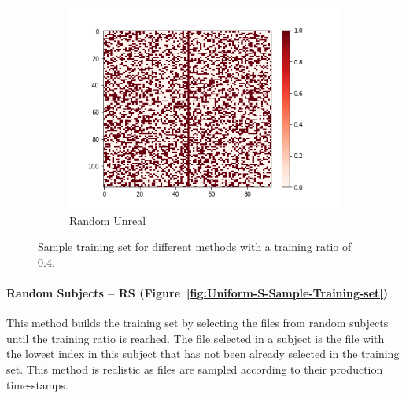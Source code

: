 \documentclass[10pt, conference, compsocconf]{IEEEtran}
\begin{document}
\begin{figure}[h!]
\begin{subfigure}[b]{0.4\linewidth}
        \includegraphics[width=\columnwidth]{figures/5vs7_random-unreal_04_training}
                  \caption{Random Unreal}
                  \label{fig:Random-Unreal-Sample-Training-set}
        \end{subfigure}
        \caption{Sample training set for different methods with a training ratio of 0.4.}                
\end{figure}

\paragraph{Random Subjects -- RS (Figure~\ref{fig:Uniform-S-Sample-Training-set})} This method builds the 
training set by selecting the files from random subjects 
until the training ratio is reached. The file selected in a 
subject is the file with the lowest index in this subject that has not 
been already selected in the training set. This method is realistic as 
files are sampled according to their production time-stamps. 
\end{document}
